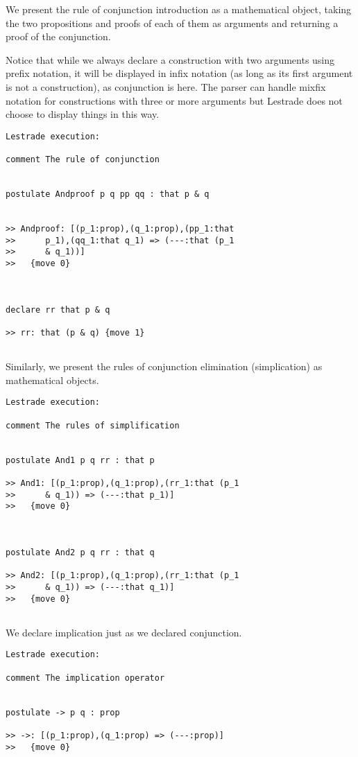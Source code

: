 \documentclass[12pt]{article}
\begin{document}
We present the rule of conjunction introduction as a mathematical object, taking the two propositions and proofs of each of them as arguments
and returning a proof of the conjunction.

Notice that while we always declare a construction with two arguments using prefix notation, it will be displayed in infix notation (as long as its first argument is not a construction), as conjunction is here.
The parser can handle mixfix notation for constructions with three or more arguments but Lestrade does not choose to display things in this way.

\begin{verbatim}Lestrade execution:

comment The rule of conjunction


postulate Andproof p q pp qq : that p & q


>> Andproof: [(p_1:prop),(q_1:prop),(pp_1:that
>>      p_1),(qq_1:that q_1) => (---:that (p_1
>>      & q_1))]
>>   {move 0}



declare rr that p & q

>> rr: that (p & q) {move 1}


\end{verbatim}

Similarly, we present the rules of conjunction elimination (simplication) as mathematical objects.

\begin{verbatim}Lestrade execution:

comment The rules of simplification


postulate And1 p q rr : that p

>> And1: [(p_1:prop),(q_1:prop),(rr_1:that (p_1
>>      & q_1)) => (---:that p_1)]
>>   {move 0}



postulate And2 p q rr : that q

>> And2: [(p_1:prop),(q_1:prop),(rr_1:that (p_1
>>      & q_1)) => (---:that q_1)]
>>   {move 0}


\end{verbatim}

We declare implication just as we declared conjunction.

\begin{verbatim}Lestrade execution:

comment The implication operator


postulate -> p q : prop

>> ->: [(p_1:prop),(q_1:prop) => (---:prop)]
>>   {move 0}


\end{verbatim}
\end{document}
